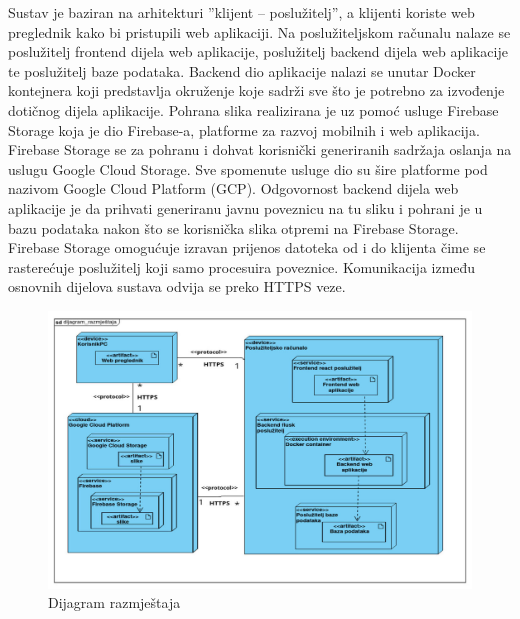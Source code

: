 			 Sustav je baziran na arhitekturi ”klijent – poslužitelj”, a klijenti koriste web preglednik kako bi pristupili web aplikaciji. Na poslužiteljskom računalu nalaze se poslužitelj frontend dijela web aplikacije, poslužitelj backend dijela web aplikacije te poslužitelj baze podataka. Backend dio aplikacije nalazi se unutar Docker kontejnera koji predstavlja okruženje koje sadrži sve što je potrebno za izvođenje dotičnog dijela aplikacije. Pohrana slika realizirana je uz pomoć usluge Firebase Storage koja je dio Firebase-a, platforme za razvoj mobilnih i web aplikacija. Firebase Storage se za pohranu i dohvat korisnički generiranih sadržaja oslanja na uslugu Google Cloud Storage. Sve spomenute usluge dio su šire platforme pod nazivom Google Cloud Platform (GCP). Odgovornost backend dijela web aplikacije je da prihvati generiranu javnu poveznicu na tu sliku i pohrani je u bazu podataka nakon što se korisnička slika otpremi na Firebase Storage. Firebase Storage omogućuje izravan prijenos datoteka od i do klijenta čime se rasterećuje poslužitelj koji samo procesuira poveznice. Komunikacija između osnovnih dijelova sustava odvija se preko HTTPS veze.
			 \begin{figure}[htbp]
				\centering
				\includegraphics[width=1\textwidth]{dijagrami/diagram_razmjestaja_new2.jpeg}
				\caption{Dijagram razmještaja}
			\label{fig:my_image}
			\end{figure}
			\eject 

			
			
